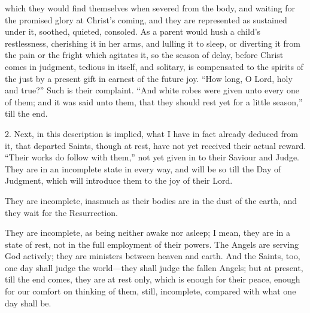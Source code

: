 which they would find themselves when severed from the body, and
waiting for the promised glory at Christ's coming, and they are
represented as sustained under it, soothed, quieted, consoled. As a
parent would hush a child's restlessness, cherishing it in her arms,
and lulling it to sleep, or diverting it from the pain or the fright
which agitates it, so the season of delay, before Christ comes in
judgment, tedious in itself, and solitary, is compensated to the
spirits of the just by a present gift in earnest of the future joy.
``How long, O Lord, holy and true?'' Such is their complaint.
``And white robes were given unto every one of them; and it was
said unto them, that they should rest yet for a little season,''
till the end.

2. Next, in this description is implied, what I have in fact
already deduced from it, that departed Saints, though at rest, have
not yet received their actual reward. ``Their works do follow with
them,'' not yet given in to their Saviour and Judge. They are in
an incomplete state in every way, and will be so till the Day of
Judgment, which will introduce them to the joy of their Lord.

They are incomplete, inasmuch as their bodies are in the dust of
the earth, and they wait for the Resurrection.

They are incomplete, as being neither awake nor asleep; I mean,
they are in a state of rest, not in the full employment of their
powers. The Angels are serving God actively; they are ministers
between heaven and earth. And the Saints, too, one day shall judge the
world—they shall judge the fallen Angels; but at present, till the
end comes, they are at rest only, which is enough for their peace,
enough for our comfort on thinking of them, still, incomplete,
compared with what one day shall be.

